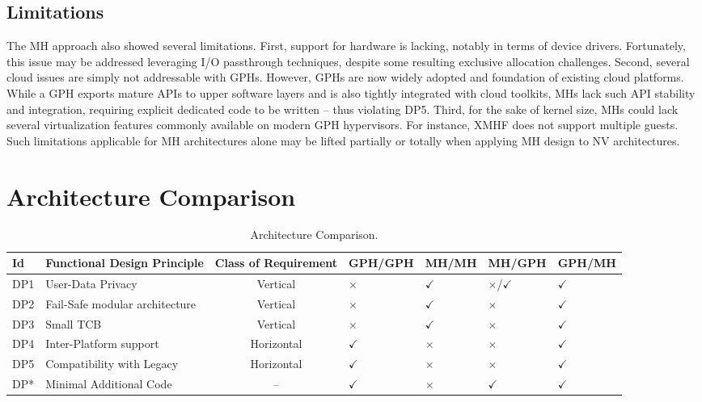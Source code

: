 \documentclass{sig-alternate}
\begin{document}
\subsection{Limitations}

\noindent The MH approach also showed several limitations. First, support for hardware is lacking, notably in terms of device drivers. Fortunately, this issue may be addressed leveraging I/O passthrough techniques, despite some resulting exclusive allocation challenges.
Second, several cloud issues are simply not addressable with GPHs. However, GPHs are now widely adopted and foundation of existing cloud platforms. While a GPH exports mature APIs to upper software layers and is also tightly integrated with cloud toolkits, MHs lack such API stability and integration, requiring explicit dedicated code to be written -- thus violating DP5.  
Third, for the sake of kernel size, MHs could lack several virtualization features commonly available on modern GPH hypervisors. For instance, XMHF does not support multiple guests. Such limitations applicable for MH architectures alone may be lifted partially or totally when applying MH design to NV architectures. 

\section{Architecture Comparison}
\label{sec:archcomp}

\begin{table}[htbp]
\caption{Architecture Comparison.\label{fin:conf}}
\centering
\begin{tabular}{llcllll}
\toprule
Id & Functional Design Principle & Class of Requirement & GPH/GPH & MH/MH & MH/GPH & GPH/MH\\
\midrule
DP1  & User-Data Privacy               & Vertical   & $\times$      & $\checkmark$  & $\times$/$\checkmark$ & $\checkmark$ \\
DP2  & Fail-Safe modular architecture  & Vertical   & $\times$      & $\checkmark$  & $\times$ & $\checkmark$ \\
DP3  & Small TCB                       & Vertical   &  $\times$     & $\checkmark$  & $\times$ & $\checkmark$ \\
DP4  & Inter-Platform support          & Horizontal & $\checkmark$  & $\times$      & $\times$ & $\checkmark$ \\
DP5  & Compatibility with Legacy       & Horizontal & $\checkmark$  & $\times$      & $\times$ & $\checkmark$ \\
DP* & Minimal Additional Code         & --         & $\checkmark$  & $\times$      & $\checkmark$ & $\checkmark$ \\
\bottomrule
\end{tabular}
\end{table}
\end{document}
